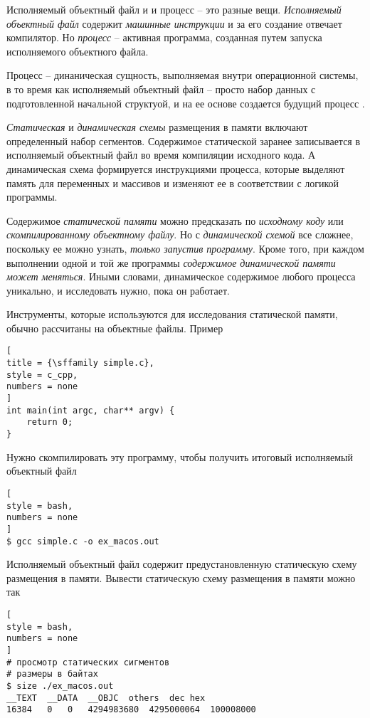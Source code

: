 \documentclass[%
	11pt,
	a4paper,
	utf8,
		]{article}
\begin{document}
Исполняемый объектный файл и и процесс -- это разные вещи. \emph{Исполняемый объектный файл} содержит \emph{машинные инструкции} и за его создание отвечает компилятор. Но \emph{процесс} -- активная программа, созданная путем запуска исполняемого объектного файла.

Процесс -- динаническая сущность, выполняемая внутри операционной системы, в то время как исполняемый объектный файл -- просто набор данных с подготовленной начальной структуой, и на ее основе создается будущий процесс \cite[]{amini-extreme-c:2022}.

\emph{Статическая} и \emph{динамическая схемы} размещения в памяти включают определенный набор сегментов. Содержимое статической заранее записывается в исполняемый объектный файл во время компиляции исходного кода. А динамическая схема формируется инструкциями процесса, которые выделяют память для переменных и массивов и изменяют ее в соответствии с логикой программы.

Содержимое \emph{статической памяти} можно предсказать по \emph{исходному коду} или \emph{скомпилированному объектному файлу}. Но с \emph{динамической схемой} все сложнее, поскольку ее можно узнать, \emph{только запустив программу}. Кроме того, при каждом выполнении одной и той же программы \emph{содержимое динамической памяти может меняться}. Иными словами, динамическое содержимое любого процесса уникально, и исследовать нужно, пока он работает.

Инструменты, которые используются для исследования статической памяти, обычно рассчитаны на объектные файлы. Пример
\begin{lstlisting}[
title = {\sffamily simple.c},
style = c_cpp,
numbers = none
]
int main(int argc, char** argv) {
    return 0;
}
\end{lstlisting}

Нужно скомпилировать эту программу, чтобы получить итоговый исполняемый объектный файл
\begin{lstlisting}[
style = bash,
numbers = none
]
$ gcc simple.c -o ex_macos.out
\end{lstlisting}

Исполняемый объектный файл содержит предустановленную статическую схему размещения в памяти. Вывести статическую схему размещения в памяти можно так
\begin{lstlisting}[
style = bash,
numbers = none
]
# просмотр статических сигментов
# размеры в байтах
$ size ./ex_macos.out
__TEXT	__DATA	__OBJC	others	dec	hex
16384	0	0	4294983680	4295000064	100008000
\end{lstlisting}
\end{document}
